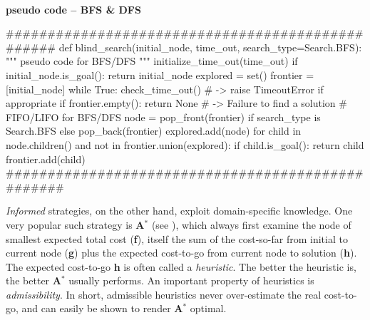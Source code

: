 \paragraph{}{\textbf{pseudo code -- BFS \& DFS}}
\label{sec:TheoryBFSDFS}
\begin{pseudocode}
#################################################
def blind_search(initial_node, time_out, search_type=Search.BFS):
   """ pseudo code for BFS/DFS """
    initialize_time_out(time_out)
    if initial_node.is_goal():
        return initial_node
    explored = set()
    frontier = [initial_node]
    while True:
        check_time_out() # -> raise TimeoutError if appropriate
        if frontier.empty():
            return None # -> Failure to find a solution
       # FIFO/LIFO for BFS/DFS
        node = pop_front(frontier) if search_type is Search.BFS else pop_back(frontier)
        explored.add(node)
        for child in node.children() and not in frontier.union(explored):
            if child.is_goal():
                return child
            frontier.add(child)
##################################################
\end{pseudocode}
\black
\textit{Informed} strategies, on the other hand, exploit domain-specific knowledge. One very popular such strategy is \textbf{A$^{*}$} (see \cite{DBLP:journals/jacm/DechterP85}), which always first examine the node of smallest expected total cost (\textbf{f}), itself the sum of the cost-so-far from initial to current node (\textbf{g}) plus the expected cost-to-go from current node to solution (\textbf{h}). The expected cost-to-go \textbf{h} is often called a \textit{heuristic}. The better the heuristic is, the better \textbf{A$^{*}$} usually performs. An important property of heuristics is \textit{admissibility}. In short, admissible heuristics never over-estimate the real cost-to-go, and can easily be shown to render \textbf{A$^{*}$} optimal.
\teal
